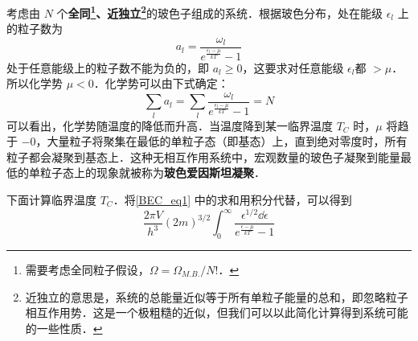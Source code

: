 

考虑由 $N$ 个\textbf{全同\footnote{需要考虑全同粒子假设，$\Omega=\Omega_{M.B.}/N!$．}、近独立\footnote{近独立的意思是，系统的总能量近似等于所有单粒子能量的总和，即忽略粒子相互作用势．这是一个极粗糙的近似，但我们可以以此简化计算得到系统可能的一些性质．}}的玻色子组成的系统．根据玻色分布，处在能级 $\epsilon_l$ 上的粒子数为
\begin{equation}
a_l=\frac{\omega_l}{e^{\frac{\epsilon_l-\mu}{kT}}-1}
\end{equation}
处于任意能级上的粒子数不能为负的，即 $a_l\ge 0$，这要求对任意能级 $\epsilon_l$都 $>\mu$．所以化学势 $\mu<0$．化学势可以由下式确定：
\begin{equation}\label{BEC_eq1}
\sum_la_l=\sum_l \frac{\omega_l}{e^{\frac{\epsilon_l-\mu}{kT}}-1} =N
\end{equation}
可以看出，化学势随温度的降低而升高．当温度降到某一临界温度 $T_C$ 时，$\mu$ 将趋于 $-0$，大量粒子将聚集在最低的单粒子态（即基态）上，直到绝对零度时，所有粒子都会凝聚到基态上．这种无相互作用系统中，宏观数量的玻色子凝聚到能量最低的单粒子态上的现象就被称为\textbf{玻色爱因斯坦凝聚}．

下面计算临界温度 $T_C$．将\autoref{BEC_eq1} 中的求和用积分代替，可以得到
\begin{equation}
\frac{2\pi V}{h^3}(2m)^{3/2}\int_0^\infty \frac{\epsilon^{1/2}\dd \epsilon}{e^{\frac{\epsilon-\mu}{kT}}-1}
\end{equation}
